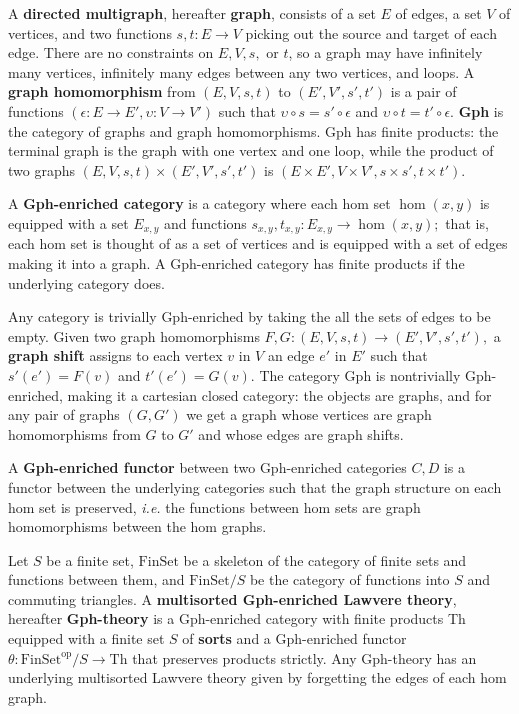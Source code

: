 \documentclass{llncs}
\newcommand{\maps}{\colon}
\newcommand{\Th}{\mathrm{Th}}
\newcommand{\FinSet}{\mathrm{FinSet}}
\newcommand{\op}{\mathrm{op}}
\begin{document}
A {\bf directed multigraph}, hereafter {\bf graph}, consists of a set $E$ of edges, a set $V$ of vertices, and two functions $s,t\maps E \to V$ picking out the source and target of each edge.  There are no constraints on $E, V, s,$ or $t$, so a graph may have infinitely many vertices, infinitely many edges between any two vertices, and loops.  A {\bf graph homomorphism} from $(E, V, s, t)$ to $(E', V', s', t')$ is a pair of functions $(\epsilon\maps E \to E', \upsilon\maps V \to V')$ such that $\upsilon\circ s = s' \circ \epsilon$ and $\upsilon\circ t = t' \circ \epsilon$.  {\bf Gph} is the category of graphs and graph homomorphisms.  Gph has finite products: the terminal graph is the graph with one vertex and one loop, while the product of two graphs $(E, V, s, t) \times (E', V', s', t')$ is $(E \times E', V \times V', s \times s', t\times t').$

A {\bf Gph-enriched category} is a category where each hom set $\hom(x,y)$ is equipped with a set $E_{x,y}$ and functions $s_{x,y}, t_{x,y}\maps E_{x,y} \to \hom(x,y);$ that is, each hom set is thought of as a set of vertices and is equipped with a set of edges making it into a graph.  A Gph-enriched category has finite products if the underlying category does.

Any category is trivially Gph-enriched by taking the all the sets of edges to be empty.  Given two graph homomorphisms $F, G\maps (E, V, s, t) \to (E', V', s', t'),$ a {\bf graph shift} assigns to each vertex $v$ in $V$ an edge $e'$ in $E'$ such that $s'(e') = F(v)$ and $t'(e') = G(v).$  The category Gph is nontrivially Gph-enriched, making it a cartesian closed category: the objects are graphs, and for any pair of graphs $(G, G')$ we get a graph whose vertices are graph homomorphisms from $G$ to $G'$ and whose edges are graph shifts.

A {\bf Gph-enriched functor} between two Gph-enriched categories $C, D$ is a functor between the underlying categories such that the graph structure on each hom set is preserved, {\em i.e.} the functions between hom sets are graph homomorphisms between the hom graphs.

Let $S$ be a finite set, $\FinSet$ be a skeleton of the category of finite sets and functions between them, and $\FinSet/S$ be the category of functions into $S$ and commuting triangles.  A {\bf multisorted Gph-enriched Lawvere theory}, hereafter {\bf Gph-theory} is a Gph-enriched category with finite products Th equipped with a finite set $S$ of {\bf sorts} and a Gph-enriched functor $\theta\maps \FinSet^{\op}/S \to \Th$ that preserves products strictly.  Any Gph-theory has an underlying multisorted Lawvere theory given by forgetting the edges of each hom graph.
\end{document}
